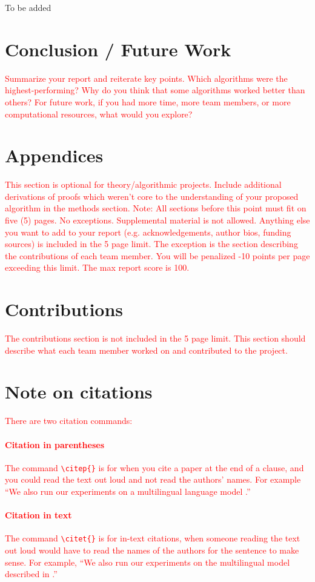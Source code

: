 \documentclass{article}
\begin{document}
To be added


\section{Conclusion / Future Work}
\textcolor{red}{
Summarize your report and reiterate key points. Which algorithms were the highest-performing? Why do you think that some algorithms worked better than others? For future work, if you had more time, more team members, or more computational resources, what would you explore?
}

\section{Appendices}
\textcolor{red}{
This section is optional for theory/algorithmic projects. Include additional derivations of proofs which weren’t core to the understanding of your proposed algorithm in the methods section.
Note: All sections before this point must fit on five (5) pages. No exceptions. Supplemental material is not allowed. Anything else you want to add to your report (e.g. acknowledgements, author bios, funding sources) is included in the 5 page limit. The exception is the section describing the contributions of each team member. You will be penalized -10 points per page exceeding this limit. The max report score is 100.
}

\section{Contributions}
\textcolor{red}{
The contributions section is not included in the 5 page limit. This section should describe what each team member worked on and contributed to the project.
}

\section{Note on citations}
\textcolor{red}{
There are two citation commands:
}

\textcolor{red}{
\paragraph{Citation in parentheses} The command \texttt{\textbackslash{}citep\{\}}  is for when you cite a paper at the end of a clause, and you could read the text out loud and not read the authors' names. For example ``We also run our experiments on a multilingual language model \citep{rajpurkar2018know}.'' 
}

\textcolor{red}{
\paragraph{Citation in text} The command \texttt{\textbackslash{}citet\{\}} is for in-text citations, when someone reading the text out loud would have to read the names of the authors for the sentence to make sense. For example, ``We also run our experiments on the multilingual model described in \citet{rajpurkar2018know}.''
}



\end{document}

